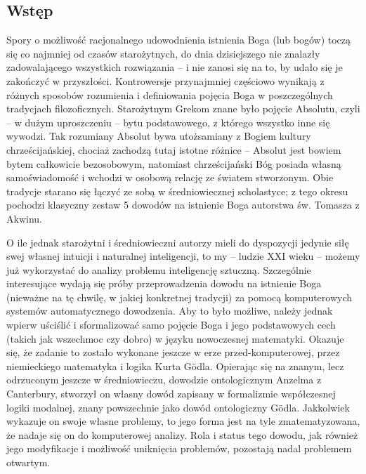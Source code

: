 \documentclass[12pt]{article}
\begin{document}
\begin{multicols}{2}

\section{Wstęp} \label{sec:intro}
Spory o możliwość racjonalnego udowodnienia istnienia Boga (lub bogów) toczą się co najmniej od czasów starożytnych, do dnia dzisiejszego nie znalazły zadowalającego wszystkich rozwiązania -- i nie zanosi się na to, by udało się je zakończyć w przyszłości. Kontrowersje przynajmniej częściowo wynikają z różnych sposobów rozumienia i definiowania pojęcia Boga w poszczególnych tradycjach filozoficznych. Starożytnym Grekom znane było pojęcie Absolutu, czyli -- w dużym uproszczeniu -- bytu podstawowego, z którego wszystko inne się wywodzi. Tak rozumiany Absolut bywa utożsamiany z Bogiem kultury chrześcijańskiej, chociaż zachodzą tutaj istotne różnice -- Absolut jest bowiem bytem całkowicie bezosobowym, natomiast chrześcijański Bóg posiada własną samoświadomość i wchodzi w osobową relację ze światem stworzonym. Obie tradycje starano się łączyć ze sobą w średniowiecznej scholastyce; z tego okresu pochodzi klasyczny zestaw 5 dowodów na istnienie Boga autorstwa św. Tomasza z Akwinu. 

O ile jednak starożytni i średniowieczni autorzy mieli do dyspozycji jedynie siłę swej własnej intuicji i naturalnej inteligencji, to my -- ludzie XXI wieku -- możemy już wykorzystać do analizy problemu inteligencję sztuczną. Szczególnie interesujące wydają się próby przeprowadzenia dowodu na istnienie Boga (nieważne na tę chwilę, w jakiej konkretnej tradycji) za pomocą komputerowych systemów automatycznego dowodzenia. Aby to było możliwe, należy jednak wpierw uściślić i sformalizować samo pojęcie Boga i jego podstawowych cech (takich jak wszechmoc czy dobro) w języku nowoczesnej matematyki. Okazuje się, że zadanie to zostało wykonane jeszcze w erze przed-komputerowej, przez niemieckiego matematyka i logika Kurta G\"odla. Opierając się na znanym, lecz odrzuconym jeszcze w średniowieczu, dowodzie ontologicznym Anzelma z Canterbury, stworzył on własny dowód zapisany w formalizmie współczesnej logiki modalnej, znany powszechnie jako dowód ontologiczny G\"odla. Jakkolwiek wykazuje on swoje własne problemy, to jego forma jest na tyle zmatematyzowana, że nadaje się on do komputerowej analizy. Rola i status tego dowodu, jak również jego modyfikacje i możliwość uniknięcia problemów, pozostają nadal problemem otwartym. 


\end{multicols}
\end{document}
